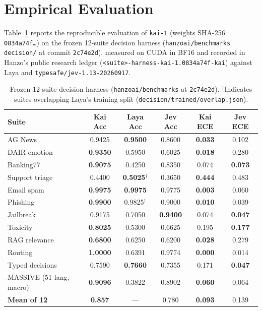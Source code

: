 \documentclass[11pt,a4paper]{article}
\begin{document}
\section{Empirical Evaluation}

Table~\ref{tab:benchmarks} reports the reproducible evaluation of \texttt{kai-1} (weights SHA-256 \texttt{0834a74f\dots}) on the frozen 12-suite decision harness (\texttt{hanzoai/benchmarks} \texttt{decision/} at commit \texttt{2c74e2d}), measured on CUDA in BF16 and recorded in Hanzo's public research ledger (\texttt{<suite>-harness-kai-1.0834a74f-kai}) against Laya and \texttt{typesafe/jev-1.13-20260917}.

\begin{table}[h]
\centering
\small
\begin{tabular}{lccccc}
\toprule
\textbf{Suite} & \textbf{Kai Acc} & \textbf{Laya Acc} & \textbf{Jev Acc} & \textbf{Kai ECE} & \textbf{Jev ECE} \\
\midrule
AG News & 0.9425 & \textbf{0.9500} & 0.8600 & \textbf{0.033} & 0.102 \\
DAIR emotion & \textbf{0.9350} & 0.5950 & 0.6025 & \textbf{0.018} & 0.280 \\
Banking77 & \textbf{0.9075} & 0.4250 & 0.8350 & 0.074 & \textbf{0.073} \\
Support triage & 0.4400 & \textbf{0.5025}$^\dagger$ & 0.3650 & \textbf{0.444} & 0.483 \\
Email spam & \textbf{0.9975} & \textbf{0.9975} & 0.9775 & \textbf{0.003} & 0.060 \\
Phishing & \textbf{0.9900} & 0.9825$^\dagger$ & 0.9000 & \textbf{0.010} & 0.039 \\
Jailbreak & 0.9175 & 0.7050 & \textbf{0.9400} & 0.074 & \textbf{0.047} \\
Toxicity & \textbf{0.8025} & 0.5300 & 0.6625 & 0.195 & \textbf{0.177} \\
RAG relevance & \textbf{0.6800} & 0.6250 & 0.6200 & \textbf{0.028} & 0.279 \\
Routing & \textbf{1.0000} & 0.6391 & 0.9774 & \textbf{0.000} & 0.014 \\
Typed decisions & 0.7590 & \textbf{0.7660} & 0.7355 & 0.171 & \textbf{0.047} \\
MASSIVE (51 lang, macro) & \textbf{0.9096} & 0.3822 & 0.8902 & \textbf{0.060} & 0.064 \\
\midrule
\textbf{Mean of 12} & \textbf{0.857} & --- & 0.780 & \textbf{0.093} & 0.139 \\
\bottomrule
\end{tabular}
\caption{Frozen 12-suite decision harness (\texttt{hanzoai/benchmarks} at \texttt{2c74e2d}). $^\dagger$Indicates suites overlapping Laya's training split (\texttt{decision/trained/overlap.json}).}
\label{tab:benchmarks}
\end{table}
\end{document}
